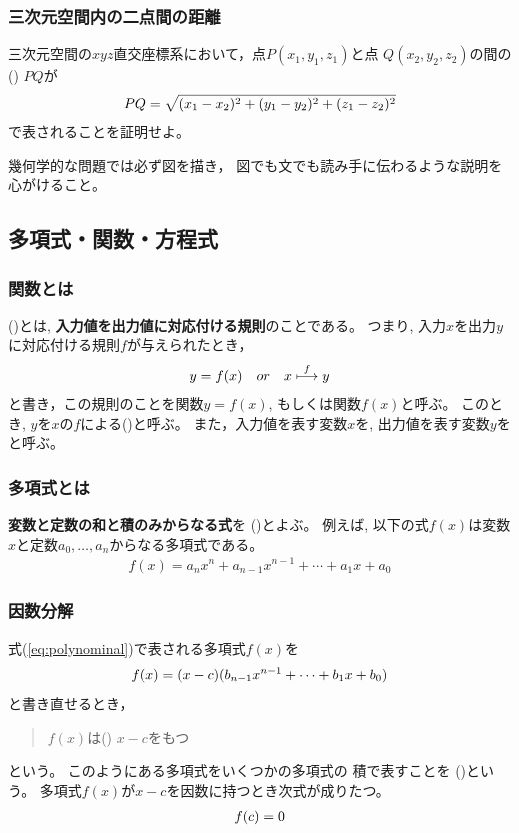 \documentclass[twocolumn,11pt]{jarticle}
\begin{document}
\subsubsection{三次元空間内の二点間の距離}
三次元空間の$xyz$直交座標系において，点$P(x_1,y_1,z_1)$と点
$Q(x_2,y_2,z_2)$の間の()
$PQ$が
\begin{align}
 PQ=\sqrt{(x_1-x_2)^2+(y_1-y_2)^2+(z_1-z_2)^2} \notag
\end{align}
で表されることを証明せよ。

\comment
幾何学的な問題では必ず図を描き，
図でも文でも読み手に伝わるような説明を心がけること。

\subsection{多項式・関数・方程式}

\subsubsection{関数とは}
()とは, 
\textbf{入力値を出力値に対応付ける規則}のことである。
つまり, 入力$x$を出力$y$に対応付ける規則$f$が与えられたとき，
\begin{align}
  y=f(x)\quad or\quad x \overset{f}{\longmapsto} y\notag
\end{align}
と書き，この規則のことを関数$y=f(x)$, もしくは関数$f(x)$と呼ぶ。
このとき, $y$を$x$の$f$による()と呼ぶ。
また，入力値を表す変数$x$を, 
出力値を表す変数$y$をと呼ぶ。


\subsubsection{多項式とは}
\textbf{変数と定数の和と積のみからなる式}を
()とよぶ。
例えば, 以下の式$f(x)$は変数$x$と定数$a_0,\ldots,a_n$からなる多項式である。
\begin{align}
  \label{eq:polynominal}
  f(x)=a_nx^n+a_{n-1}x^{n-1}+\cdots+a_1x+a_0
\end{align}

\subsubsection{因数分解}
式(\ref{eq:polynominal})で表される多項式$f(x)$を
\begin{align}
f(x)=(x-c)(b_{n-1}x^{n-1}+\cdots+b_1x+b_0) \notag
\end{align}
と書き直せるとき，
\begin{quote}
$f(x)$は()
$x-c$をもつ
\end{quote}
という。
このようにある多項式をいくつかの多項式の
積で表すことを
  ()という。
多項式$f(x)$が$x-c$を因数に持つとき次式が成りたつ。
\begin{align}
  f(c)=0  \notag
\end{align}
\end{document}

